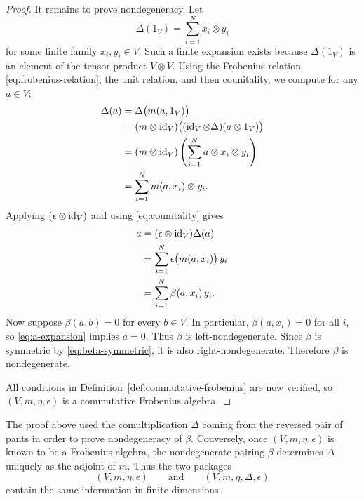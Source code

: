 \begin{proof}
\noindent It remains to prove nondegeneracy. Let
\begin{equation}\label{eq:Delta-of-unit}
\Delta(1_V) = \sum_{i=1}^N x_i \otimes y_i
\end{equation}
for some finite family $x_i,y_i \in V$. Such a finite expansion exists because $\Delta(1_V)$ is an element of the tensor product $V \otimes V$. Using the Frobenius relation \eqref{eq:frobenius-relation}, the unit relation, and then counitality, we compute for any $a \in V$:
\begin{align}
\Delta(a)
&= \Delta\bigl(m(a,1_V)\bigr) \label{eq:Delta-a-start} \\
&= (m \otimes \operatorname{id}_V)\bigl((\operatorname{id}_V \otimes \Delta)(a \otimes 1_V)\bigr) \nonumber \\
&= (m \otimes \operatorname{id}_V)\left(\sum_{i=1}^N a \otimes x_i \otimes y_i\right) \nonumber \\
&= \sum_{i=1}^N m(a,x_i) \otimes y_i. \label{eq:Delta-a-expanded}
\end{align}
Applying $(\epsilon \otimes \operatorname{id}_V)$ and using \eqref{eq:counitality} gives
\begin{align}
a
&= (\epsilon \otimes \operatorname{id}_V)\Delta(a) \label{eq:counit-a} \\
&= \sum_{i=1}^N \epsilon\bigl(m(a,x_i)\bigr)\, y_i \nonumber \\
&= \sum_{i=1}^N \beta(a,x_i)\, y_i. \label{eq:a-expansion}
\end{align}
Now suppose $\beta(a,b)=0$ for every $b \in V$. In particular, $\beta(a,x_i)=0$ for all $i$, so \eqref{eq:a-expansion} implies $a=0$. Thus $\beta$ is left-nondegenerate. Since $\beta$ is symmetric by \eqref{eq:beta-symmetric}, it is also right-nondegenerate. Therefore $\beta$ is nondegenerate.

\medskip

\noindent All conditions in Definition~\ref{def:commutative-frobenius} are now verified, so $(V,m,\eta,\epsilon)$ is a commutative Frobenius algebra.
\end{proof}

\begin{remark}\label{rem:recover-Delta}
The proof above used the comultiplication $\Delta$ coming from the reversed pair of pants in order to prove nondegeneracy of $\beta$. Conversely, once $(V,m,\eta,\epsilon)$ is known to be a Frobenius algebra, the nondegenerate pairing $\beta$ determines $\Delta$ uniquely as the adjoint of $m$. Thus the two packages
\begin{equation}\label{eq:two-packages}
(V,m,\eta,\epsilon)
\qquad\text{and}\qquad
(V,m,\eta,\Delta,\epsilon)
\end{equation}
contain the same information in finite dimensions.
\end{remark}

